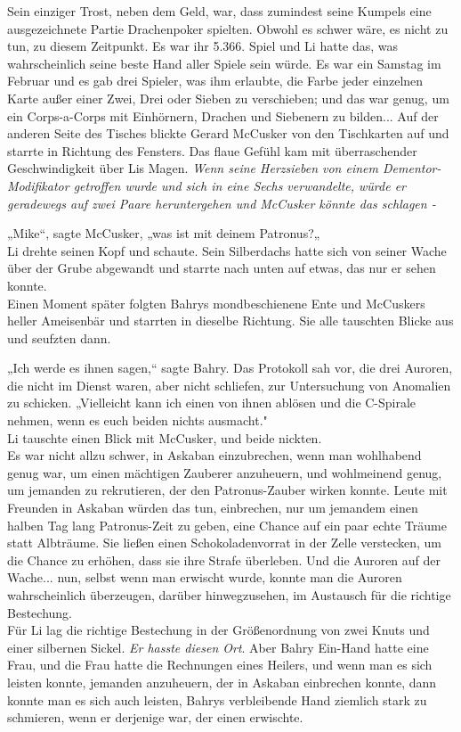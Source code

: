 {Sein einziger Trost, neben dem Geld, war, dass zumindest seine Kumpels eine ausgezeichnete Partie Drachenpoker spielten. Obwohl es schwer wäre, es nicht zu tun, zu diesem Zeitpunkt. Es war ihr 5.366. Spiel und Li hatte das, was wahrscheinlich seine beste Hand aller Spiele sein würde. Es war ein Samstag im Februar und es gab drei Spieler, was ihm erlaubte, die Farbe jeder einzelnen Karte außer einer Zwei, Drei oder Sieben zu verschieben; und das war genug, um ein Corps-a-Corps mit Einhörnern, Drachen und Siebenern zu bilden... Auf der anderen Seite des Tisches blickte Gerard McCusker von den Tischkarten auf und starrte in Richtung des Fensters. Das flaue Gefühl kam mit überraschender Geschwindigkeit über Lis Magen. \emph{Wenn seine Herzsieben von einem Dementor-Modifikator getroffen wurde und sich in eine Sechs verwandelte, würde er geradewegs auf zwei Paare heruntergehen und McCusker könnte das schlagen -}

„Mike“, sagte McCusker, „was ist mit deinem Patronus?„\\ Li drehte seinen Kopf und schaute. Sein Silberdachs hatte sich von seiner Wache über der Grube abgewandt und starrte nach unten auf etwas, das nur er sehen konnte.\\ Einen Moment später folgten Bahrys mondbeschienene Ente und McCuskers heller Ameisenbär und starrten in dieselbe Richtung. Sie alle tauschten Blicke aus und seufzten dann.

„Ich werde es ihnen sagen,“ sagte Bahry. Das Protokoll sah vor, die drei Auroren, die nicht im Dienst waren, aber nicht schliefen, zur Untersuchung von Anomalien zu schicken. „Vielleicht kann ich einen von ihnen ablösen und die C-Spirale nehmen, wenn es euch beiden nichts ausmacht."\\ Li tauschte einen Blick mit McCusker, und beide nickten.\\ Es war nicht allzu schwer, in Askaban einzubrechen, wenn man wohlhabend genug war, um einen mächtigen Zauberer anzuheuern, und wohlmeinend genug, um jemanden zu rekrutieren, der den Patronus-Zauber wirken konnte. Leute mit Freunden in Askaban würden das tun, einbrechen, nur um jemandem einen halben Tag lang Patronus-Zeit zu geben, eine Chance auf ein paar echte Träume statt Albträume. Sie ließen einen Schokoladenvorrat in der Zelle verstecken, um die Chance zu erhöhen, dass sie ihre Strafe überleben. Und die Auroren auf der Wache... nun, selbst wenn man erwischt wurde, konnte man die Auroren wahrscheinlich überzeugen, darüber hinwegzusehen, im Austausch für die richtige Bestechung.\\ Für Li lag die richtige Bestechung in der Größenordnung von zwei Knuts und einer silbernen Sickel. \emph{Er hasste diesen Ort}. Aber Bahry Ein-Hand hatte eine Frau, und die Frau hatte die Rechnungen eines Heilers, und wenn man es sich leisten konnte, jemanden anzuheuern, der in Askaban einbrechen konnte, dann konnte man es sich auch leisten, Bahrys verbleibende Hand ziemlich stark zu schmieren, wenn er derjenige war, der einen erwischte.

}
